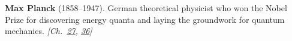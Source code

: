 \nobelphysics \textbf{Max Planck} (1858–1947). German theoretical physicist who won the Nobel Prize for discovering energy quanta and laying the groundwork for quantum mechanics. \emph{[Ch.~\hyperref[ch:planetaryskycolors]{27}, \hyperref[ch:qftvsgr]{36}]}

